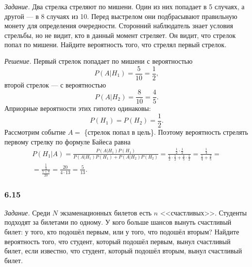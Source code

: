 \textit{Задание.} Два стрелка стреляют по мишени.
Один из них попадает в 5 случаях, а другой --- в 8 случаях из 10.
Перед выстрелом они подбрасывают правильную монету для определения очередности.
Сторонний наблюдатель знает условия стрельбы, но не видит, кто в данный момент стреляет.
Он видит, что стрелок попал по мишени.
Найдите вероятность того, что стрелял первый стрелок.

\textit{Решение.} Первый стрелок попадает по мишени с вероятностью
$$P \left( \left. A \right| H_1 \right) =
\frac{5}{10} =
\frac{1}{2},$$
второй стрелок --- с вероятностью
$$P \left( \left. A \right| H_2 \right) =
\frac{8}{10} =
\frac{4}{5}.$$
Априорные вероятности этих гипотез одинаковы:
$$P \left( H_1 \right) =
P \left( H_2 \right) =
\frac{1}{2}.$$
Рассмотрим событие $A =$ \{стрелок попал в цель\}.
Поэтому вероятность стрелять первому стрелку по формуле Байеса равна
\begin{equation*}
\begin{split}
P \left( \left. H_1 \right| A \right) =
\frac{P \left( \left. A \right| H_1 \right) P \left( H_1 \right) }{P \left( \left. A \right| H_1 \right) P \left( H_1 \right) +
P \left( \left. A \right| H_2 \right) P \left( H_2 \right) } =
\frac{ \frac{1}{2} \cdot \frac{1}{2} }{ \frac{1}{2} \cdot \frac{1}{2} + \frac{4}{5} \cdot \frac{1}{2} } =
\frac{ \frac{1}{4} }{ \frac{1}{4} + \frac{2}{5} } = \\
= \frac{ \frac{1}{4} }{ \frac{5+8}{20} } =
\frac{20}{4 \cdot 13} =
\frac{5}{13}.
\end{split}
\end{equation*}

\subsubsection*{6.15}

\textit{Задание.} Среди $N$ экзаменационных билетов есть $n$ <<счастливых>>.
Студенты подходят за билетами по одному.
У кого больше шансов вынуть счастливый билет: у того, кто подошёл первым, или у того, что подошёл вторым?
Найдите вероятность того, что студент, который подошёл первым, вынул счастливый билет, если известно, что студент, который подошёл вторым, вынул счастливый билет.

